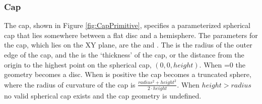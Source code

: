 \subsubsection{Cap}
The cap, shown in Figure \ref{fig:CapPrimitive}, specifies a parameterized spherical cap that lies somewhere between a flat disc and a hemisphere.
The parameters for the cap, which lies on the XY plane, are the  and .
The  is the radius of the outer edge of the cap, and the  is the `thickness' of the cap,
or the distance from the origin to the highest point on the spherical cap, $(0,0,height)$.  When =0 the geometry becomes a disc.  When  is positive the cap becomes a truncated sphere, where the radius of curvature of the cap is $\frac{radius^2 + height^2}{2 \cdot height}$.  When $height > radius$ no valid spherical cap exists and the cap geometry is undefined.
